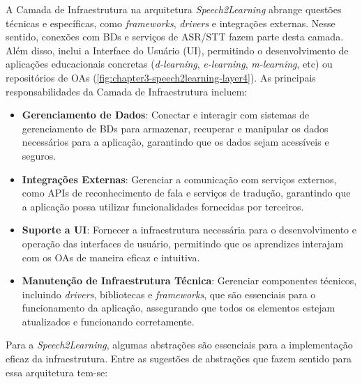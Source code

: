 A Camada de Infraestrutura na arquitetura \textit{Speech2Learning} abrange questões técnicas e específicas, como \textit{frameworks}, \textit{drivers} e integrações externas. Nesse sentido, conexões com BDs e serviços de ASR/STT fazem parte desta camada. Além disso, inclui a Interface do Usuário (UI), permitindo o desenvolvimento de aplicações educacionais concretas (\textit{d-learning}, \textit{e-learning}, \textit{m-learning}, etc) ou repositórios de OAs (\autoref{fig:chapter3-speech2learning-layer4}). As principais responsabilidades da Camada de Infraestrutura incluem:

\begin{itemize}
    \item \textbf{Gerenciamento de Dados}: Conectar e interagir com sistemas de gerenciamento de BDs para armazenar, recuperar e manipular os dados necessários para a aplicação, garantindo que os dados sejam acessíveis e seguros.

    \item \textbf{Integrações Externas}: Gerenciar a comunicação com serviços externos, como APIs de reconhecimento de fala e serviços de tradução, garantindo que a aplicação possa utilizar funcionalidades fornecidas por terceiros.

    \item \textbf{Suporte a UI}: Fornecer a infraestrutura necessária para o desenvolvimento e operação das interfaces de usuário, permitindo que os aprendizes interajam com os OAs de maneira eficaz e intuitiva.

    \item \textbf{Manutenção de Infraestrutura Técnica}: Gerenciar componentes técnicos, incluindo \textit{drivers}, bibliotecas e \textit{frameworks}, que são essenciais para o funcionamento da aplicação, assegurando que todos os elementos estejam atualizados e funcionando corretamente.
\end{itemize}

Para a \textit{Speech2Learning}, algumas abstrações são essenciais para a implementação eficaz da infraestrutura. Entre as sugestões de abstrações que fazem sentido para essa arquitetura tem-se:


